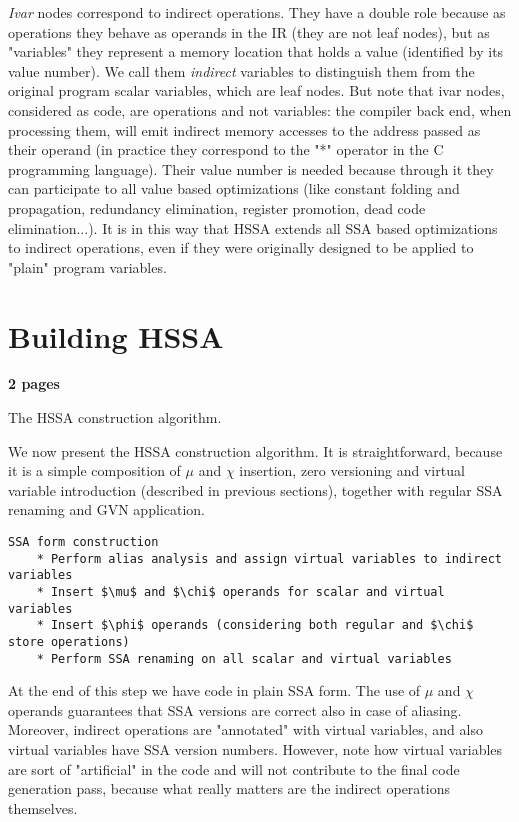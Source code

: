 {\em Ivar} nodes correspond to indirect operations.
They have a double role because as operations they behave as operands in the IR (they are not leaf nodes), but as "variables" they represent a memory location that holds a value (identified by its value number).
We call them {\em indirect} variables to distinguish them from the original program scalar variables, which are leaf nodes.
But note that ivar nodes, considered as code, are operations and not variables: the compiler back end, when processing them, will emit indirect memory accesses to the address passed as their operand (in practice they correspond to the "*" operator in the C programming language).
Their value number is needed because through it they can participate to all value based optimizations (like constant folding and propagation, redundancy elimination, register promotion, dead code elimination...).
It is in this way that HSSA extends all SSA based optimizations to indirect operations, even if they were originally designed to be applied to "plain" program variables.


\section{Building HSSA}
\textbf{2 pages}

The HSSA construction algorithm.

We now present the HSSA construction algorithm.
It is straightforward, because it is a simple composition of $\mu$ and $\chi$ insertion, zero versioning and virtual variable introduction (described in previous sections), together with regular SSA renaming and GVN application.


\begin{verbatim}
SSA form construction
    * Perform alias analysis and assign virtual variables to indirect variables
    * Insert $\mu$ and $\chi$ operands for scalar and virtual variables
    * Insert $\phi$ operands (considering both regular and $\chi$ store operations)
    * Perform SSA renaming on all scalar and virtual variables
\end{verbatim}

At the end of this step we have code in plain SSA form.
The use of $\mu$ and $\chi$ operands guarantees that SSA versions are correct also in case of aliasing.
Moreover, indirect operations are "annotated" with virtual variables, and also virtual variables have SSA version numbers.
However, note how virtual variables are sort of "artificial" in the code and will not contribute to the final code generation pass, because what really matters are the indirect operations themselves.

